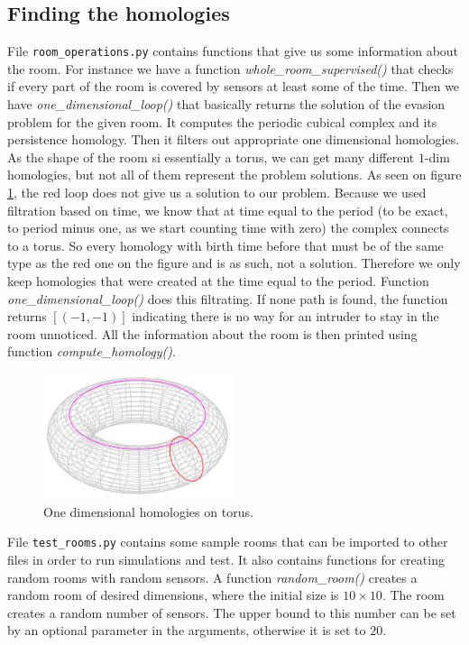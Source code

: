 \documentclass{article}
\begin{document}
\subsection*{Finding the homologies}

File \texttt{room\_operations.py} contains functions that give us some information about the room. For instance we have a function \textit{whole\_room\_supervised()} that checks if every part of the room is covered by sensors at least some of the time. Then we have \textit{one\_dimensional\_loop()} that basically returns the solution of the evasion problem for the given room. It computes the periodic cubical complex and its persistence homology. Then it filters out appropriate one dimensional homologies. As the shape of the room si essentially a torus, we can get many different $1$-dim homologies, but not all of them represent the problem solutions. As seen on figure \ref{fig:torus}, the red loop does not give us a solution to our problem. Because we used filtration based on time, we know that at time equal to the period (to be exact, to period minus one, as we start counting time with zero) the complex connects to a torus. So every homology with birth time before that must be of the same type as the red one on the figure and is as such, not a solution. Therefore we only keep homologies that were created at the time equal to the period. Function \textit{one\_dimensional\_loop()} does this filtrating. If none path is found, the function returns $[(-1, -1)]$ indicating there is no way for an intruder to stay in the room unnoticed.
All the information about the room is then printed using function \textit{compute\_homology()}.

\begin{figure}[!h]
    \centering
    \includegraphics[width=0.5\textwidth]{Torus_cycles.svg.png}
    \caption{One dimensional homologies on torus.}
    \label{fig:torus}
\end{figure}

File \texttt{test\_rooms.py} contains some sample rooms that can be imported to other files in order to run simulations and test. It also contains functions for creating random rooms with random sensors. A function \textit{random\_room()} creates a random room of desired dimensions, where the initial size is $10 \times 10$. The room creates a random number of sensors. The upper bound to this number can be set by an optional parameter in the arguments, otherwise it is set to $20$.
\end{document}
